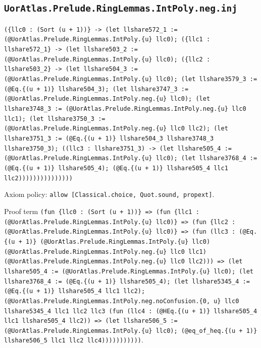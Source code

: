 \documentclass[11pt]{article}
\begin{document}
\subsection*{\texttt{UorAtlas.Prelude.RingLemmas.IntPoly.neg.inj}}
\noindent\texttt{(\{llc0 : (Sort (u + 1))\} -> (let llshare572\_1 := (@UorAtlas.Prelude.RingLemmas.IntPoly.\{u\} llc0); (\{llc1 : llshare572\_1\} -> (let llshare503\_2 := (@UorAtlas.Prelude.RingLemmas.IntPoly.\{u\} llc0); (\{llc2 : llshare503\_2\} -> (let llshare504\_3 := (@UorAtlas.Prelude.RingLemmas.IntPoly.\{u\} llc0); (let llshare3579\_3 := (@Eq.\{(u + 1)\} llshare504\_3); (let llshare3747\_3 := (@UorAtlas.Prelude.RingLemmas.IntPoly.neg.\{u\} llc0); (let llshare3748\_3 := (@UorAtlas.Prelude.RingLemmas.IntPoly.neg.\{u\} llc0 llc1); (let llshare3750\_3 := (@UorAtlas.Prelude.RingLemmas.IntPoly.neg.\{u\} llc0 llc2); (let llshare3751\_3 := (@Eq.\{(u + 1)\} llshare504\_3 llshare3748\_3 llshare3750\_3); ((llc3 : llshare3751\_3) -> (let llshare505\_4 := (@UorAtlas.Prelude.RingLemmas.IntPoly.\{u\} llc0); (let llshare3768\_4 := (@Eq.\{(u + 1)\} llshare505\_4); (@Eq.\{(u + 1)\} llshare505\_4 llc1 llc2)))))))))))))))}\par
\noindent Axiom policy: \texttt{allow [Classical.choice, Quot.sound, propext]}.\par
\noindent Proof term \texttt{(fun \{llc0 : (Sort (u + 1))\} => (fun \{llc1 : (@UorAtlas.Prelude.RingLemmas.IntPoly.\{u\} llc0)\} => (fun \{llc2 : (@UorAtlas.Prelude.RingLemmas.IntPoly.\{u\} llc0)\} => (fun (llc3 : (@Eq.\{(u + 1)\} (@UorAtlas.Prelude.RingLemmas.IntPoly.\{u\} llc0) (@UorAtlas.Prelude.RingLemmas.IntPoly.neg.\{u\} llc0 llc1) (@UorAtlas.Prelude.RingLemmas.IntPoly.neg.\{u\} llc0 llc2))) => (let llshare505\_4 := (@UorAtlas.Prelude.RingLemmas.IntPoly.\{u\} llc0); (let llshare3768\_4 := (@Eq.\{(u + 1)\} llshare505\_4); (let llshare5345\_4 := (@Eq.\{(u + 1)\} llshare505\_4 llc1 llc2); (@UorAtlas.Prelude.RingLemmas.IntPoly.neg.noConfusion.\{0, u\} llc0 llshare5345\_4 llc1 llc2 llc3 (fun (llc4 : (@HEq.\{(u + 1)\} llshare505\_4 llc1 llshare505\_4 llc2)) => (let llshare506\_5 := (@UorAtlas.Prelude.RingLemmas.IntPoly.\{u\} llc0); (@eq\_of\_heq.\{(u + 1)\} llshare506\_5 llc1 llc2 llc4)))))))))))}.\par
\end{document}
